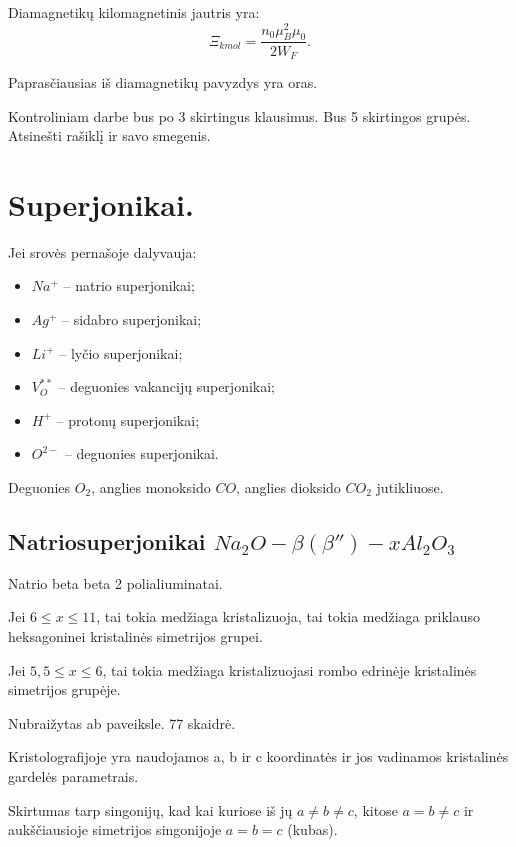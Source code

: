 Diamagnetikų kilomagnetinis jautris yra:
\begin{equation*}
  \Xi_{kmol} = \frac{n_{0}\mu_{B}^{2}\mu_{0}}{2W_{F}}.
\end{equation*}

Paprasčiausias iš diamagnetikų pavyzdys yra oras.

Kontroliniam darbe bus po 3 skirtingus klausimus. Bus 5 skirtingos
grupės. Atsinešti rašiklį ir savo smegenis.

\section{Superjonikai.}

Jei srovės pernašoje dalyvauja:
\begin{itemize}
  \item $Na^{+}$ – natrio superjonikai;
  \item $Ag^{+}$ – sidabro superjonikai;
  \item $Li^{+}$ – lyčio superjonikai;
  \item $V_{O}^{**}$ – deguonies vakancijų superjonikai;
  \item $H^{+}$ – protonų superjonikai;
  \item $O^{2-}$ – deguonies superjonikai.
\end{itemize}

Deguonies $O_{2}$, anglies monoksido $CO$, anglies dioksido $CO_{2}$
jutikliuose.

\subsection{Natriosuperjonikai $Na_{2}O-\beta(\beta'')-xAl_{2}O_{3}$}

Natrio beta beta 2 polialiuminatai.

Jei $6 \leq x \leq 11$, tai tokia medžiaga kristalizuoja, tai tokia
medžiaga priklauso heksagoninei kristalinės simetrijos grupei.

Jei $5,5 \leq x \leq 6$, tai tokia medžiaga kristalizuojasi rombo
edrinėje kristalinės simetrijos grupėje.

Nubraižytas ab paveiksle. 77 skaidrė.

Kristolografijoje yra naudojamos a, b ir c koordinatės ir jos vadinamos
kristalinės gardelės parametrais.

Skirtumas tarp singonijų, kad kai kuriose iš jų $a \neq b \neq c$,
kitose $a = b \neq c$ ir aukščiausioje simetrijos singonijoje
$a = b = c$ (kubas).

